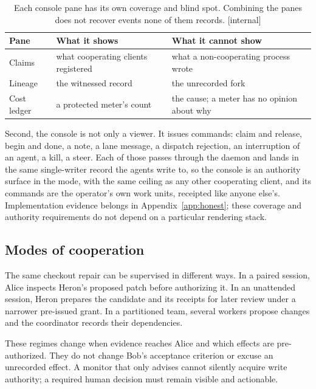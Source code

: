 \documentclass[11pt,a4paper]{article}
\theoremstyle{definition}
\theoremstyle{plain}
\begin{document}
\begin{table}[H]
\centering
\small
\renewcommand{\arraystretch}{1.25}
\setlength{\tabcolsep}{4pt}
\begin{tabularx}{\textwidth}{@{}>{\raggedright\arraybackslash}p{} >{\raggedright\arraybackslash}X >{\raggedright\arraybackslash}X@{}}
\toprule
\textbf{Pane} & \textbf{What it shows} & \textbf{What it cannot show} \\
\midrule
Claims & what cooperating clients registered & what a non-cooperating process wrote \\
Lineage & the witnessed record & the unrecorded fork \\
Cost ledger & a protected meter's count & the cause; a meter has no opinion about why \\
\bottomrule
\end{tabularx}
\caption{Each console pane has its own coverage and blind spot. Combining
the panes does not recover events none of them records. [internal]}
\label{tab:pane-floors}
\end{table}

Second, the console is not only a viewer. It issues commands: claim and
release, begin and done, a note, a lane message, a dispatch rejection, an
interruption of an agent, a kill, a steer. Each of those passes through the
daemon and lands in the same single-writer record the agents write to, so the
console is an authority surface in the  mode, with
the same ceiling as any other cooperating client, and its commands are the
operator's own work units, receipted like anyone else's. Implementation evidence belongs in Appendix~\ref{app:honest}; these coverage
and authority requirements do not depend on a particular rendering stack.

\subsection{Modes of cooperation}\label{sec:cooperation-modes}

The same checkout repair can be supervised in different ways. In a paired
session, Alice inspects Heron's proposed patch before authorizing it. In an
unattended session, Heron prepares the candidate and its receipts for later
review under a narrower pre-issued grant. In a partitioned team, several
workers propose changes and the coordinator records their dependencies.

These regimes change when evidence reaches Alice and which effects are
pre-authorized. They do not change Bob's acceptance criterion or excuse an
unrecorded effect. A monitor that only advises cannot silently acquire write
authority; a required human decision must remain visible and actionable.
\end{document}
